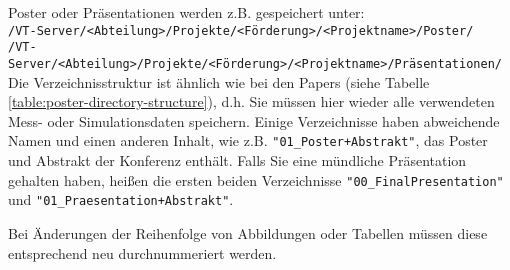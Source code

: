 \begin{table}[!h]
  \caption{%
  Die Daten jedes Beitrags müssen in sieben Unterverzeichnissen gespeichert
  werden; weitere Hinweise: \\
  ** Wenn das Poster präsentiert wurde, lädt der jeweilige Präsentator die
  letzte und überarbeitete Version (d.h. nur die wirklich verwendeten, aber
  absolut vollständigen Daten) in das geschützte Verzeichnis \\
  ***Wenn die in einer Abbildung/Tabelle wiedergegebenen Daten aus verteilten
  Rohdatenverzeichnissen stammt, genügt es, hier nur das erzeugende Programm zu
  speichern%
  }

\label{table:poster-directory-structure}
\end{table}
\noindent Poster oder Präsentationen werden z.B. gespeichert unter: \\
\texttt{/VT-Server/<Abteilung>/Projekte/<Förderung>/<Projektname>/Poster/} \\
\texttt{/VT-Server/<Abteilung>/Projekte/<Förderung>/<Projektname>/Präsentationen/} \\
%
Die Verzeichnisstruktur ist ähnlich wie bei den Papers (siehe Tabelle \ref{table:poster-directory-structure}), d.h. Sie müssen hier
wieder alle verwendeten Mess- oder Simulationsdaten speichern. Einige
Verzeichnisse haben abweichende Namen und einen anderen Inhalt, wie z.B.
\texttt{"01\_Poster+Abstrakt"}, das Poster und Abstrakt der Konferenz enthält.
Falls Sie eine mündliche Präsentation gehalten haben, heißen die ersten beiden
Verzeichnisse \texttt{"00\_FinalPresentation"} und
\texttt{"01\_Praesentation+Abstrakt"}.


Bei Änderungen der Reihenfolge von Abbildungen oder Tabellen müssen diese entsprechend neu durchnummeriert werden.
